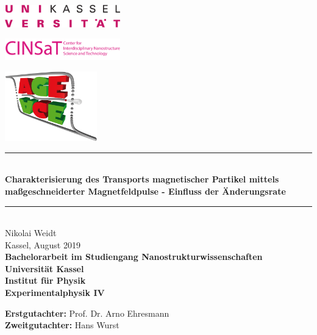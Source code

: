 \begin{titlepage}
  \begin{center}
    \begin{minipage}[T]{0.3\textwidth}
      \begin{flushleft}
        \includegraphics[width=5cm]{img/Uni}
      \end{flushleft}
    \end{minipage}
    \begin{minipage}[T]{0.3\textwidth}
      \centering
      \includegraphics[width=5cm]{img/CINSaT}
    \end{minipage}
    \begin{minipage}[T]{0.3\textwidth}
      \begin{flushright}
        \includegraphics[width=4cm]{img/AGE}
      \end{flushright}
    \end{minipage}
  \end{center}


  \begin{center}
    \rule{\columnwidth}{1 pt}\\
    \vspace{0.5cm}
    {\LARGE
      \textbf{Charakterisierung des Transports magnetischer Partikel mittels maßgeschneiderter Magnetfeldpulse - Einfluss der Änderungsrate} \\ 
    }
    \rule{\columnwidth}{1 pt}\\
    \vspace{2cm}
    {\Large
      Nikolai Weidt\\
      Kassel, August 2019\\
      \vspace{1.5cm}
    }
    {\bfseries
    Bachelorarbeit im Studiengang Nanostrukturwissenschaften\\ 
    Universität Kassel\\
    Institut für Physik\\
    Experimentalphysik IV\\
    }
    \end{center}
      \vfill
      {\begin{tabbing}
      \textbf{Erstgutachter:} Prof. Dr. Arno Ehresmann \\
      \textbf{Zweitgutachter:} Hans Wurst\\
      \end{tabbing}
      }

\end{titlepage}
\restoregeometry
